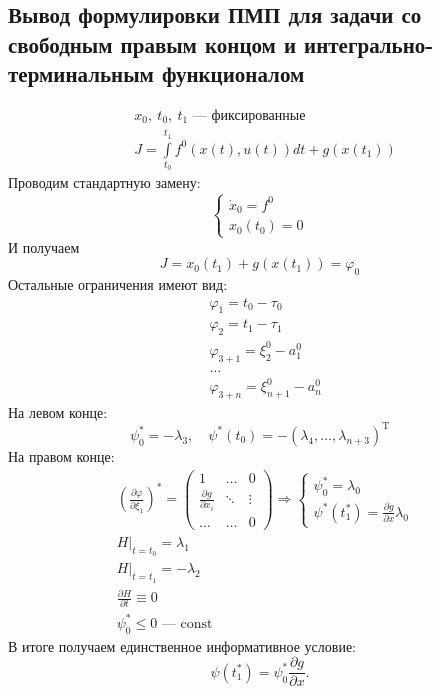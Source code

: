 \documentclass[oneside, final, 14pt, draft]{article}
\theoremstyle{definition}
\theoremstyle{definition}
\theoremstyle{remark}
\theoremstyle{theorem}
\renewcommand{\leq}{\leqslant}
\begin{document}
\subsection{Вывод формулировки ПМП для задачи со свободным правым концом и интегрально-терминальным функционалом}
\begin{align*}
&x_0,\ t_0,\ t_1 \text{ --- фиксированные}\\
&J = \int\limits_{t_0}^{t_1} f^0 (x(t), u(t))dt + g(x(t_1))
\end{align*}
Проводим стандартную замену:
\begin{equation*}
\begin{cases}
\dot{x}_0 = f^0\\ 
x_0(t_0) = 0
\end{cases}
\end{equation*}
И получаем
$$  J = x_0(t_1) + g(x(t_1)) = \varphi_0$$
Остальные ограничения имеют вид:
\begin{align*}
&\varphi_1 = t_0 - \tau_0\\
&\varphi_2 = t_1 - \tau_1\\
&\varphi_{3 + 1} = \xi_2^0 - a_1^0\\
&\ldots\\
&\varphi_{3 + n} = \xi_{n + 1}^0 - a_n^0
\end{align*}
На левом конце:
$$ \psi_0^* = -\lambda_3, \quad \psi^*(t_0) = -(\lambda_4,\ldots, \lambda_{n+3})^\mathrm{T}$$
На правом конце:
\begin{align*}
&\left( \frac{\partial\varphi}{\partial \xi_1}\right)^* = \begin{pmatrix}
    1 & \dots & 0 \\
    \frac{\partial g}{\partial x_i}& \ddots & \vdots \\
    \ldots & \dots & 0
\end{pmatrix} \Rightarrow 
\begin{cases}
    \psi_0^*=\lambda_0\\
    \psi^*(t_1^*) = \frac{\partial g}{\partial x} \lambda_0
\end{cases}\\
&H|_{t = t_0} = \lambda_1\\
&H|_{t = t_1} = -\lambda_2\\
&\frac{\partial H}{\partial t} \equiv 0\\
&\psi_0^* \leq 0 \text{ --- const}
\end{align*}
В итоге получаем единственное информативное условие:
$$\psi(t_1^*) = \psi_0^*\frac{\partial g}{\partial x}.$$
\end{document}
